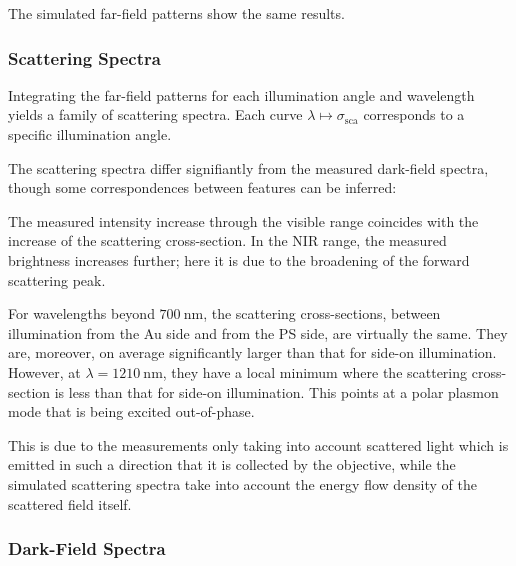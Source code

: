 \documentclass[10pt]{article}
\begin{document}
\begin{multicols}{2}
The simulated far-field patterns show the same results. 

\subsubsection*{Scattering Spectra}

Integrating the far-field patterns for each illumination angle and wavelength yields a family of scattering spectra. 
Each curve $\lambda\mapsto\sigma_\mathrm{sca}$ corresponds to a specific illumination angle. 

The scattering spectra differ signifiantly from the measured dark-field spectra, though some correspondences between features can be inferred: 

The measured intensity increase through the visible range coincides with the increase of the scattering cross-section. 
In the NIR range, the measured brightness increases further; here it is due to the broadening of the forward scattering peak. 

For wavelengths beyond $\SI{700}{\nano\meter}$, the scattering cross-sections, between illumination from the Au side and from the PS side, are virtually the same. 
They are, moreover, on average significantly larger than that for side-on illumination. 
However, at $\lambda=\SI{1210}{\nano\meter}$, they have a local minimum where the scattering cross-section is less than that for side-on illumination. 
This points at a polar plasmon mode that is being excited out-of-phase. 

This is due to the measurements only taking into account scattered light which is emitted in such a direction that it is collected by the objective, while the simulated scattering spectra take into account the energy flow density of the scattered field itself. 


\subsubsection*{Dark-Field Spectra}


\end{multicols}
\end{document}
